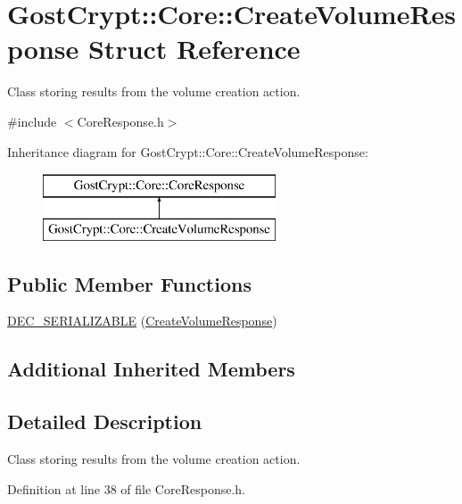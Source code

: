 \hypertarget{struct_gost_crypt_1_1_core_1_1_create_volume_response}{}\section{Gost\+Crypt\+:\+:Core\+:\+:Create\+Volume\+Response Struct Reference}
\label{struct_gost_crypt_1_1_core_1_1_create_volume_response}


Class storing results from the volume creation action.  




{\ttfamily \#include $<$Core\+Response.\+h$>$}

Inheritance diagram for Gost\+Crypt\+:\+:Core\+:\+:Create\+Volume\+Response\+:\begin{figure}[H]
\begin{center}
\leavevmode
\includegraphics[height=2.000000cm]{struct_gost_crypt_1_1_core_1_1_create_volume_response}
\end{center}
\end{figure}
\subsection*{Public Member Functions}
\begin{DoxyCompactItemize}
\item 
\hyperlink{struct_gost_crypt_1_1_core_1_1_create_volume_response_ab46fe65b01316d69f5e0322224891851}{D\+E\+C\+\_\+\+S\+E\+R\+I\+A\+L\+I\+Z\+A\+B\+LE} (\hyperlink{struct_gost_crypt_1_1_core_1_1_create_volume_response}{Create\+Volume\+Response})
\end{DoxyCompactItemize}
\subsection*{Additional Inherited Members}


\subsection{Detailed Description}
Class storing results from the volume creation action. 

Definition at line 38 of file Core\+Response.\+h.



